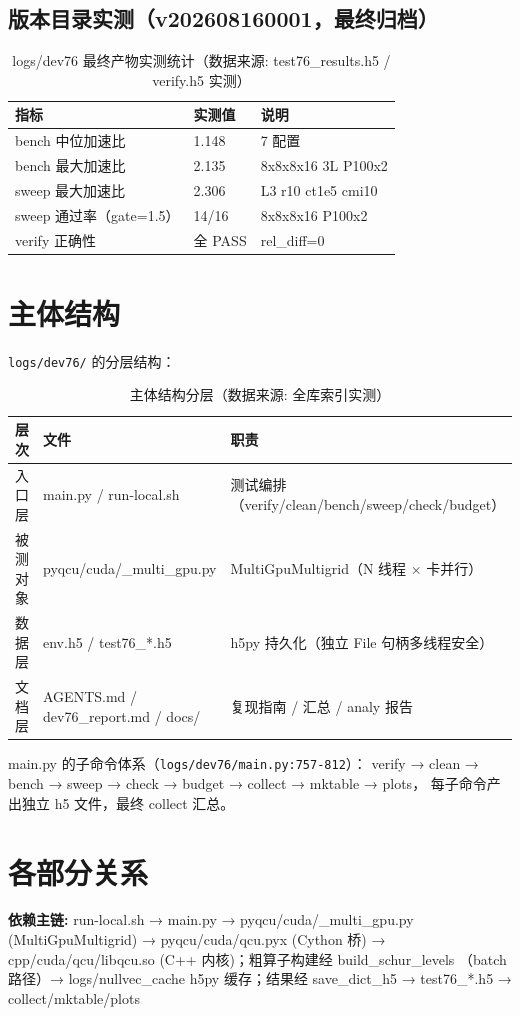 \documentclass[UTF8]{ctexart}
\begin{document}
\subsection{版本目录实测（v202608160001，最终归档）}
\begin{table}[htbp]\centering
\begin{tabular}{lll}
\toprule
指标 & 实测值 & 说明 \\
\midrule
bench 中位加速比 & 1.148 & 7 配置 \\
bench 最大加速比 & 2.135 & 8x8x8x16 3L P100x2 \\
sweep 最大加速比 & 2.306 & L3 r10 ct1e5 cmi10 \\
sweep 通过率（gate=1.5） & 14/16 & 8x8x8x16 P100x2 \\
verify 正确性 & 全 PASS & rel\_diff=0 \\
\bottomrule
\end{tabular}
\caption{logs/dev76 最终产物实测统计（数据来源: test76\_results.h5 / verify.h5 实测）}
\end{table}

\section{主体结构}
\texttt{logs/dev76/} 的分层结构：
\begin{table}[htbp]\centering
\begin{tabularx}{\textwidth}{llX}
\toprule
\textcolor{struct}{层次} & 文件 & \textcolor{struct}{职责} \\
\midrule
入口层 & main.py / run-local.sh & 测试编排（verify/clean/bench/sweep/check/budget） \\
被测对象 & pyqcu/cuda/\_multi\_gpu.py & MultiGpuMultigrid（N 线程 × 卡并行） \\
数据层 & env.h5 / test76\_*.h5 & h5py 持久化（独立 File 句柄多线程安全） \\
文档层 & AGENTS.md / dev76\_report.md / docs/ & 复现指南 / 汇总 / analy 报告 \\
\bottomrule
\end{tabularx}
\caption{主体结构分层（数据来源: 全库索引实测）}
\end{table}

main.py 的子命令体系（\texttt{logs/dev76/main.py:757-812}）：
verify → clean → bench → sweep → check → budget → collect → mktable → plots，
每子命令产出独立 h5 文件，最终 collect 汇总。

\section{各部分关系}
\begin{keybox}
\textbf{依赖主链:} \textcolor{relation}{run-local.sh → main.py →
pyqcu/cuda/\_multi\_gpu.py (MultiGpuMultigrid) → pyqcu/cuda/qcu.pyx (Cython
桥) → cpp/cuda/qcu/libqcu.so (C++ 内核)；粗算子构建经 build\_schur\_levels
（batch 路径）→ logs/nullvec\_cache h5py 缓存；结果经 save\_dict\_h5 →
test76\_*.h5 → collect/mktable/plots}
\end{keybox}
\end{document}
